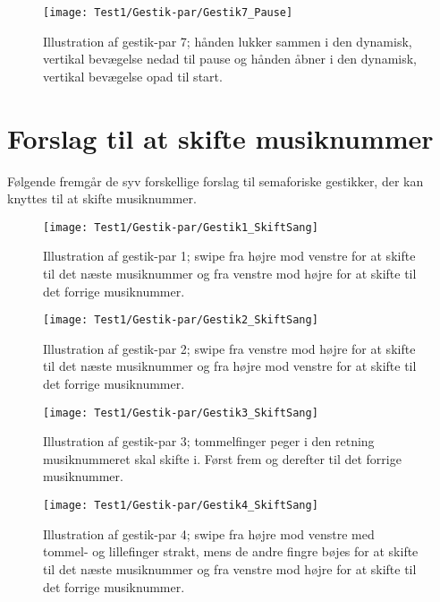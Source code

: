 \noindent
%
%
\begin{figure}[H]
	\centering
	\texttt{[image: Test1/Gestik-par/Gestik7\_Pause]}
	\caption{Illustration af gestik-par 7; hånden lukker sammen i den dynamisk, vertikal bevægelse nedad til pause og hånden åbner i den dynamisk, vertikal bevægelse opad til start.}
	\label{fig:GestikPar7Pause}
\end{figure}
\noindent
%


\section{Forslag til at skifte musiknummer}
\label{app:ForslagSkift}
%
Følgende fremgår de syv forskellige forslag til semaforiske gestikker, der kan knyttes til at skifte musiknummer.
%
\begin{figure}[H]
	\centering
	\texttt{[image: Test1/Gestik-par/Gestik1\_SkiftSang]}
	\caption{Illustration af gestik-par 1; swipe fra højre mod venstre for at skifte til det næste musiknummer og fra venstre mod højre for at skifte til det forrige musiknummer.}
	\label{fig:GestikPar1SkiftApp}
\end{figure}
\noindent
%
%
\begin{figure}[H]
	\centering
	\texttt{[image: Test1/Gestik-par/Gestik2\_SkiftSang]}
	\caption{Illustration af gestik-par 2; swipe fra venstre mod højre for at skifte til det næste musiknummer og fra højre mod venstre for at skifte til det forrige musiknummer.}
	\label{fig:GestikPar2SkiftApp}
\end{figure}
\noindent
%
%
\begin{figure}[H]
	\centering
	\texttt{[image: Test1/Gestik-par/Gestik3\_SkiftSang]}
	\caption{Illustration af gestik-par 3; tommelfinger peger i den retning musiknummeret skal skifte i. Først frem og derefter til det forrige musiknummer.}
	\label{fig:GestikPar3SkiftApp}
\end{figure}
\noindent
%
%
\begin{figure}[H]
	\centering
	\texttt{[image: Test1/Gestik-par/Gestik4\_SkiftSang]}
	\caption{Illustration af gestik-par 4; swipe fra højre mod venstre med tommel- og lillefinger strakt, mens de andre fingre bøjes for at skifte til det næste musiknummer og fra venstre mod højre for at skifte til det forrige musiknummer.}
	\label{fig:GestikPar4SkiftApp}
\end{figure}
